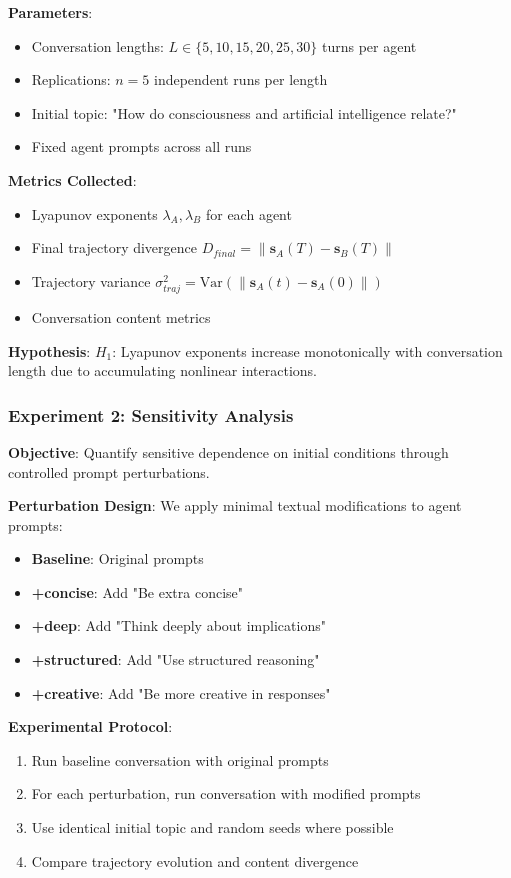\documentclass[11pt,a4paper]{article}
\begin{document}
\textbf{Parameters}:
\begin{itemize}
    \item Conversation lengths: $L \in \{5, 10, 15, 20, 25, 30\}$ turns per agent
    \item Replications: $n = 5$ independent runs per length
    \item Initial topic: "How do consciousness and artificial intelligence relate?"
    \item Fixed agent prompts across all runs
\end{itemize}

\textbf{Metrics Collected}:
\begin{itemize}
    \item Lyapunov exponents $\lambda_A, \lambda_B$ for each agent
    \item Final trajectory divergence $D_{final} = \|\mathbf{s}_A(T) - \mathbf{s}_B(T)\|$
    \item Trajectory variance $\sigma_{traj}^2 = \text{Var}(\|\mathbf{s}_A(t) - \mathbf{s}_A(0)\|)$
    \item Conversation content metrics
\end{itemize}

\textbf{Hypothesis}: $H_1$: Lyapunov exponents increase monotonically with conversation length due to accumulating nonlinear interactions.

\subsubsection{Experiment 2: Sensitivity Analysis}

\textbf{Objective}: Quantify sensitive dependence on initial conditions through controlled prompt perturbations.

\textbf{Perturbation Design}:
We apply minimal textual modifications to agent prompts:
\begin{itemize}
    \item \textbf{Baseline}: Original prompts
    \item \textbf{+concise}: Add "Be extra concise" 
    \item \textbf{+deep}: Add "Think deeply about implications"
    \item \textbf{+structured}: Add "Use structured reasoning"
    \item \textbf{+creative}: Add "Be more creative in responses"
\end{itemize}

\textbf{Experimental Protocol}:
\begin{enumerate}
    \item Run baseline conversation with original prompts
    \item For each perturbation, run conversation with modified prompts
    \item Use identical initial topic and random seeds where possible
    \item Compare trajectory evolution and content divergence
\end{enumerate}
\end{document}
